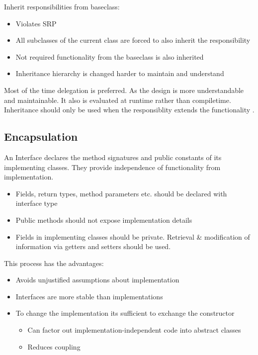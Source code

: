 \documentclass[
../../Software_Engineering_Summary.tex,
]
{subfiles}
\begin{document}
\begin{defbox}
    [Inheritance]
    Inherit responsibilities from baseclass:
    \begin{itemize}
        \item Violates SRP
        \item All subclasses of the current class are forced to also inherit the responsibility
        \item Not required functionality from the baseclass is also inherited
        \item Inheritance hierarchy is changed \rightarrow harder to maintain and understand
    \end{itemize}
\end{defbox}

Most of the time delegation is preferred. As the design is more understandable and maintainable. It also is evaluated at runtime rather than compiletime.  Inheritance should only be used when the responsiblity extends the functionality .

\subsection{Encapsulation}

\begin{defbox}
    [Interface]
    An Interface declares the method signatures and public constants of its implementing classes. They provide independence of functionality from implementation.
\end{defbox}

\begin{defbox}
    \begin{itemize}
        \item Fields, return types, method parameters etc. should be declared with interface type
        \item Public methods should not expose implementation details
        \item Fields in implementing classes should be private. Retrieval \& modification of information via getters and setters should be used.
    \end{itemize}
\end{defbox}

This process has the advantages:
\begin{itemize}
    \item Avoids unjustified assumptions about implementation
    \item Interfaces are more stable than implementations
    \item To change the implementation its sufficient to exchange the constructor
    \begin{itemize}
        \item Can factor out implementation-independent code into abstract classes
        \item Reduces coupling
    \end{itemize}
\end{itemize}
\end{document}
